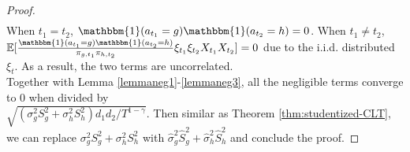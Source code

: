 \documentclass[12pt]{article}
\def\EE{{\mathbb E}}
\theoremstyle{plain}
\begin{document}
\begin{proof}
\begin{align*}
    \end{align*}
    When $t_1=t_2$, $\mathbbm{1}(a_{t_1}=g)\mathbbm{1}(a_{t_2}=h)=0$. When $t_1\neq t_2$, $\EE[\frac{\mathbbm{1}(a_{t_1}=g)\mathbbm{1}(a_{t_2}=h)}{\pi_{g,t_1}\pi_{h,t_2}}\xi_{t_1}\xi_{t_2}X_{t_1}X_{t_2}]=0$ due to the i.i.d. distributed $\xi_t$. As a result, the two terms are uncorrelated. \\
    Together with Lemma \ref{lemmaneg1}-\ref{lemmaneg3}, all the negligible terms converge to 0 when divided by \\ $\sqrt{(\sigma_g^2S_g^2+\sigma_h^2S_h^2)d_1d_2/T^{1-\gamma}}$. Then similar as Theorem \ref{thm:studentized-CLT}, we can replace $\sigma_g^2S_g^2+\sigma_h^2S_h^2$ with $\widehat{\sigma}_g^2\widehat{S}_g^2+\widehat{\sigma}_h^2\widehat{S}_h^2$ and conclude the proof.
\end{proof}
\end{document}
